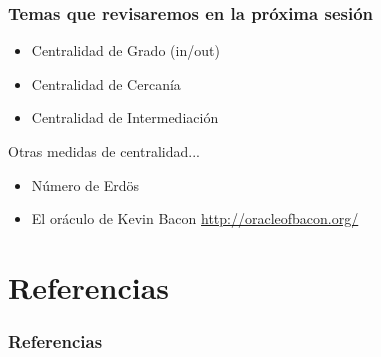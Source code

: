 \documentclass[10pt]{beamer}
\begin{document}
\begin{frame}
\frametitle{Temas que revisaremos en la pr\'oxima sesi\'on}
\begin{itemize}
\item Centralidad de Grado (in/out)
\item Centralidad de Cercan\'ia
\item Centralidad de Intermediaci\'on
\end{itemize}
Otras medidas de centralidad...
\begin{itemize}
\item N\'umero de Erd{\"o}s 
\item El or\'aculo de Kevin Bacon \url{http://oracleofbacon.org/}
\end{itemize}
\end{frame}

\section{Referencias}
\begin{frame}
\frametitle{Referencias}


\end{frame}
\end{document}
